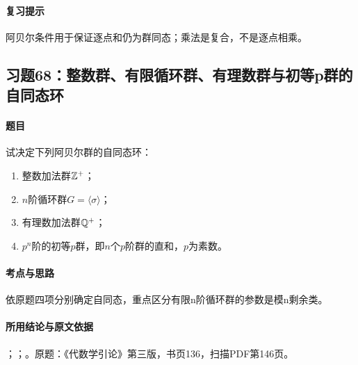 \paragraph{复习提示}

阿贝尔条件用于保证逐点和仍为群同态；乘法是复合，不是逐点相乘。



\subsection{习题68：整数群、有限循环群、有理数群与初等p群的自同态环}

\label{ex:3:68}

\paragraph{题目}

试决定下列阿贝尔群的自同态环：
\begin{enumerate}[label=(\roman*)]
\item 整数加法群$\mathbb Z^+$；
\item $n$阶循环群$G=\langle\sigma\rangle$；
\item 有理数加法群$\mathbb Q^+$；
\item $p^n$阶的初等$p$群，即$n$个$p$阶群的直和，$p$为素数。
\end{enumerate}

\paragraph{考点与思路}

依原题四项分别确定自同态，重点区分有限n阶循环群的参数是模n剩余类。

\paragraph{所用结论与原文依据}

；；。原题：《代数学引论》第三版，书页136，扫描PDF第146页。


